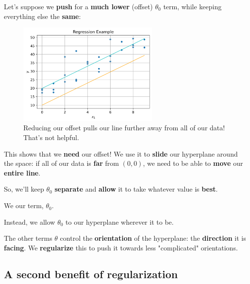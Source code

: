         Let's suppose we \textbf{push} for a \textbf{much lower} (offset) $\theta_0$ term, while keeping everything else the \textbf{same}:
        
        \begin{figure}[H]
        \centering
            \includegraphics[width=70mm,scale=0.5]{images/regression_images/Regression_Remove_Offset.png}
        
            \caption*{Reducing our offset pulls our line further away from all of our data! That's not helpful.}
        \end{figure}
        
        This shows that we \textbf{need} our offset! We use it to \textbf{slide} our hyperplane around the space: if all of our data is \textbf{far} from $(0,0)$, we need to be able to \textbf{move} our \textbf{entire line}.
        
        So, we'll keep $\theta_0$ \textbf{separate} and \textbf{allow} it to take whatever value is \textbf{best}.\\
        
        \begin{concept}
            We  our  term, $\theta_0$. 
            
            Instead, we allow $\theta_0$ to  our hyperplane wherever it  to be.
        \end{concept}
        
        The other terms $\theta$ control the \textbf{orientation} of the hyperplane: the \textbf{direction} it is \textbf{facing}. We \textbf{regularize} this to push it towards less "complicated" orientations.

        
    \subsection{A second benefit of regularization}
    
